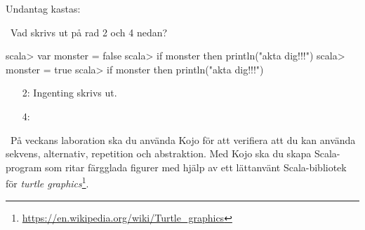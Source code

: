 \Subtask {}

\SOLUTION

\TaskSolved \what

\SubtaskSolved {}

\SubtaskSolved {}

\SubtaskSolved {}

\SubtaskSolved {}


\SubtaskSolved {}

\SubtaskSolved {}

\SubtaskSolved {}


\SubtaskSolved {}

\SubtaskSolved Undantag kastas: 

\SubtaskSolved {}

\QUESTEND






\QUESTBEGIN

\Task \what~Vad skrivs ut på rad 2 och 4 nedan?

\begin{REPL}
scala> var monster = false
scala> if monster then println("akta dig!!!")
scala> monster = true
scala> if monster then println("akta dig!!!")
\end{REPL}

\SOLUTION

\TaskSolved \what

\begin{itemize}
\item[2:] Ingenting skrivs ut.
\item[4:] 
\end{itemize}


\QUESTEND







\QUESTBEGIN

\Task \what~På veckans laboration ska du använda Kojo för att verifiera att du kan använda sekvens, alternativ, repetition och abstraktion. Med Kojo ska du skapa Scala-program som ritar färgglada figurer med hjälp av ett lättanvänt Scala-bibliotek för \emph{turtle graphics}\footnote{\url{https://en.wikipedia.org/wiki/Turtle_graphics}}. 

